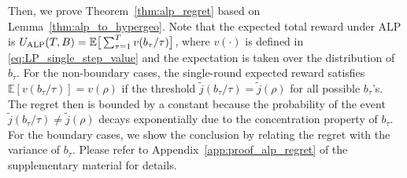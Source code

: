 
Then, we prove Theorem~\ref{thm:alp_regret} based on Lemma~\ref{thm:alp_to_hypergeo}. Note that the expected total reward under ALP is $U_{\rm ALP}(T,B) = \mathbb{E}\big[\sum_{\tau = 1}^{T}v(b_{\tau}/\tau)\big]$,
where $v(\cdot)$ is defined in \eqref{eq:LP_single_step_value} and the expectation is taken over  the distribution of $b_{\tau}$.
For the non-boundary cases, the single-round expected reward satisfies $\mathbb{E}[v(b_\tau/\tau)] = {v}(\rho)$ if the threshold $\tilde{j}(b_\tau/\tau) = \tilde{j}(\rho)$  for all possible $b_\tau$'s. The regret then is bounded by a constant because the probability of the event $\tilde{j}(b_\tau/\tau) \neq \tilde{j}(\rho)$ decays exponentially due to the concentration property of $b_\tau$.  For the boundary cases, we show the conclusion by relating the regret with the variance of $b_\tau$.
Please refer to Appendix~\ref{app:proof_alp_regret} of the supplementary material for details.

